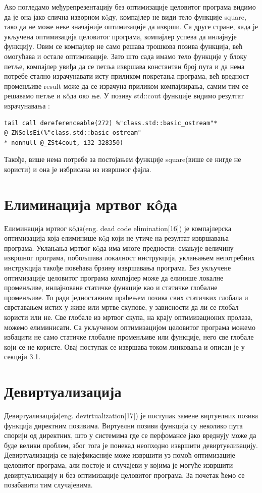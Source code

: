 \documentclass[12pt,oneside]{memoir}
\begin{document}
Ако погледамо међурепрезентацију без оптимизације целовитог програма видимо да је она јако
слична изворном к\^{o}ду, компајлер не види тело функције square, тако да не може неке 
значајније оптимизације да изврши.
Са друге стране, када је укључена оптимизација целовитог програма, компајлер
успева да инлајнује функцију.
Овим се компајлер не само решава трошкова позива функција, већ омогућава и остале оптимизације.
Зато што сада имамо тело функције у блоку петље, компајлер увиђа да се петља извршава константан
број пута и да нема потребе стално израчунавати исту приликом покретања програма, већ вредност
променљиве result може да се израчуна приликом компајлирања, самим тим се решавамо петље и
к\^{o}да око ње.
У позиву std::cout функције видимо резултат израчунавања :
\begin{lstlisting}
tail call dereferenceable(272) %"class.std::basic_ostream"*
@_ZNSolsEi(%"class.std::basic_ostream"
* nonnull @_ZSt4cout, i32 328350)
\end{lstlisting}
Такође, више нема потребе за постојањем функције square(више се нигде не користи)
и она је избрисана из извршног фајла.



\section{Елиминација мртвог к\^{o}да}

Елиминација мртвог к\^{o}да(eng. dead code elimination[16]) је компајлерска 
оптимизација која елиминише к\^{o}д који не утиче на резултат извршавања
програма.
Уклањања мртвог к\^{o}да има многе предности: смањује величину извршног програма,
побољшава локалност инструкција, уклањањем непотребних инструкција такође
повећава брзину извршавања програма.
Без укључене оптимизације целовитог програма компајлер може да елинише локалне
променљиве, инлајноване статичке функције као и статичке глобалне променљиве.
То ради једноставним праћењем позива свих статичких глобала и сврставањем истих
у живе или мртве скупове, у зависности да ли се глобал користи или не.
Све глобале из мртвог скупа, на крају оптимизационих пролаза, можемо елиминисати.
Са укљученом оптимизацијом целовитог програма можемо избацити не само статичке
глобалне променљиве или функције, него све глобале који се не користе.
Овај поступак се извршава током линковања и описан је у секцији  3.1.




\section{Девиртуализација}
 Девиртуализација(eng. devirtualization[17]) је поступак замене виртуелних позива
 функција директним позивима.
 Виртуелни позиви функција су неколико пута спорији од директних, што у системима
 где се перфомансе јако вреднују може да буде велики проблем, због тога је понекад
 неопходно извршити девиртуелизацију.
 Девиртуализација се најефикасније може извршити уз помоћ оптимизације целовитог
 програма, али постоје и случајеви у којима је могуће извршити девиртуализацију 
 и без оптимизације целовитог програма.
 За почетак ћемо се позабавити тим случајевима.
 
\end{document}
